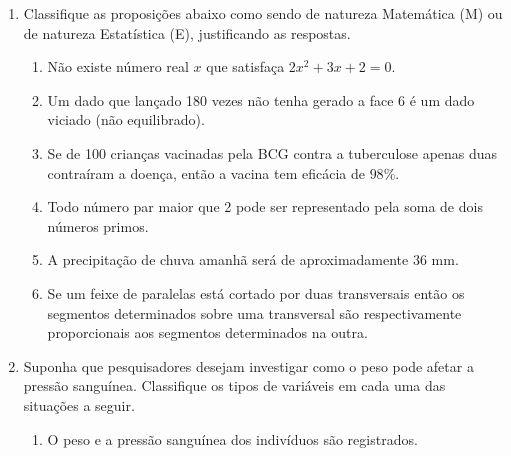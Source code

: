 {\begin{enumerate}
\begin{enumerate}
\item {} 
Uma amostra de 250 residentes de uma cidade indicou que 45 destes são funcionários públicos. Assim $18\%$ desses 250 residentes trabalham para o governo.

\item {} 
A média de idade de trabalhadores formais obtida de uma amostra de 380 habitantes de Nova Iguaçu foi de 34 anos.

\item {} 
Numa pesquisa feita com 2000 habitantes da Grande São Paulo, 768 disseram fazer uso regular de sacola ecológica pessoal em suas compras de supermercado.  A prefeitura conclui que mais de um terço dos habitantes da Grande São Paulo já aderiu à sacola ecológica.

\end{enumerate}

\item Classifique as proposições abaixo como sendo de natureza Matemática (M) ou de natureza Estatística (E), justificando as respostas.
\begin{enumerate}
\item {} 
Não existe número real \(x\) que satisfaça \(2x^2 + 3x + 2 = 0\).

\item {} 
Um dado que lançado 180 vezes não tenha gerado a face 6 é um dado viciado (não equilibrado).

\item {} 
Se de 100 crianças vacinadas pela BCG contra a tuberculose apenas duas contraíram a doença, então a vacina tem eficácia de $98\%$.

\item {} 
Todo número par maior que 2 pode ser representado pela soma de dois números primos.

\item {} 
A precipitação de chuva amanhã será de aproximadamente 36 mm.

\item {} 
Se um feixe de paralelas está cortado por duas transversais então os segmentos determinados sobre uma transversal são respectivamente proporcionais aos segmentos determinados na outra.

\end{enumerate}

\item Suponha que pesquisadores desejam investigar como o peso pode afetar a pressão sanguínea. Classifique os tipos de variáveis em cada uma das situações a seguir.
\begin{enumerate}
\item {} 
O peso e a pressão sanguínea dos indivíduos são registrados.


\end{enumerate}
\end{enumerate}}
